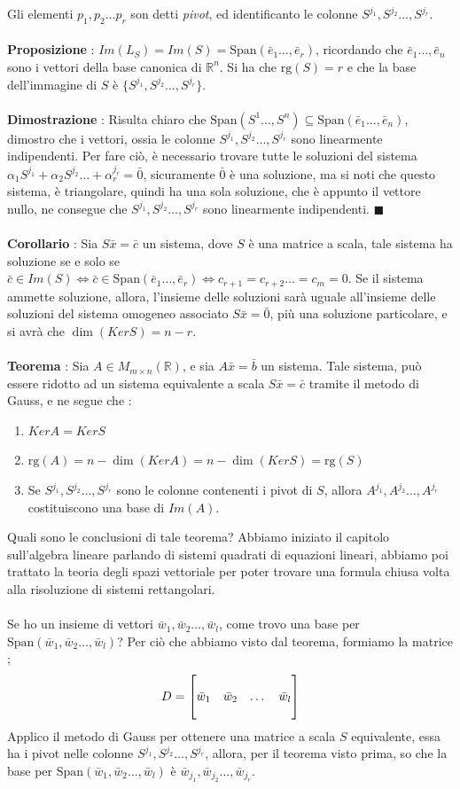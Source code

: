 \documentclass[12pt, letterpaper]{article}
\newcommand{\R}{{\mathbb R}}
\newcommand{\rg}{{\text{rg}}}
\newcommand{\acc}{\\\hphantom{}\\}
\newcommand{\Span}{{\text{Span}}}
\begin{document}
Gli elementi \(p_1,p_2\dots p_r\) son detti \textit{pivot}, ed identificanto le colonne \(S^{j_1},S^{j_2}\dots,S^{j_r}\).\acc 
\textbf{Proposizione} : \(Im(L_S)=Im(S)=\Span(\bar e_1\dots,\bar e_r)\), ricordando che \(\bar e_1\dots,\bar e_n\) sono i 
vettori della base canonica di \(\R^n\). Si ha che \(\rg(S)=r\) e che la base dell'immagine di \(S\) è \(\{S^{j_1},S^{j_2}\dots,S^{j_r}\}\).\acc 
\textbf{Dimostrazione} : Risulta chiaro che \(\Span(S^1\dots,S^n)\subseteq \Span(\bar e_1\dots,\bar e_n)\), dimostro che 
i vettori, ossia le colonne \(S^{j_1},S^{j_2}\dots,S^{j_r}\) sono linearmente indipendenti. Per fare ciò, è necessario trovare tutte 
le soluzioni del sistema  \(\alpha_1S^{j_1}+\alpha_2S^{j_2}\dots+\alpha_r^{j_r}=\bar 0\), sicuramente \(\bar 0\) è una soluzione, 
ma si noti che questo sistema, è triangolare, quindi ha una sola soluzione, che è appunto il vettore nullo, ne consegue che 
\(S^{j_1},S^{j_2}\dots,S^{j_r}\) sono linearmente indipendenti. \(\blacksquare\)\acc 
\textbf{Corollario} : Sia \(S\bar x=\bar c\) un sistema, dove \(S\) è una matrice a scala, tale sistema ha soluzione 
se e solo se \(\bar c \in Im(S)\iff \bar c \in \Span(\bar e_1\dots,\bar e_r)\iff c_{r+1}=c_{r+2}\dots = c_m=0\).
Se il sistema ammette soluzione, allora, l'insieme delle soluzioni sarà uguale all'insieme delle soluzioni 
del sistema omogeneo associato \(S\bar x=\bar0\), più una soluzione particolare, e si avrà che \(\dim(KerS)=n-r\).\acc 
\textbf{Teorema} : Sia \(A\in M_{m\times n}(\R)\), e sia \(A\bar x = \bar b\) un sistema. Tale sistema, può essere ridotto 
ad un sistema equivalente a scala \(S\bar x = \bar c\) tramite il metodo di Gauss, e ne segue che : \begin{enumerate}
    \item \(KerA=KerS\) 
    \item \(\rg(A)=n-\dim(KerA)=n-\dim(KerS)=\rg(S)\) 
    \item Se \(S^{j_1},S^{j_2}\dots,S^{j_r}\) sono le colonne contenenti i pivot di \(S\), allora 
    \(A^{j_1},A^{j_2}\dots,A^{j_r}\) costituiscono una base di \(Im(A)\).
\end{enumerate}
Quali sono le conclusioni di tale teorema? Abbiamo iniziato il capitolo sull'algebra lineare parlando di sistemi 
quadrati di equazioni lineari, abbiamo poi trattato la teoria degli spazi vettoriale per poter trovare una formula chiusa volta 
alla risoluzione di sistemi rettangolari.\acc 
Se ho un insieme di vettori \(\bar w_1,\bar w_2\dots,\bar w_l\), come trovo una base per \(\Span(\bar w_1,\bar w_2\dots,\bar w_l)\)?
Per ciò che abbiamo visto dal teorema, formiamo la matrice ; $$D=\begin{bmatrix}
    \hphantom{}&\hphantom{}&\hphantom{}&\hphantom{}\\
    \bar w_1&\bar w_2&\dots&\bar w_l\\
    \hphantom{}&\hphantom{}&\hphantom{}&\hphantom{}
\end{bmatrix}$$ Applico il metodo di Gauss per ottenere una matrice a scala \(S\) equivalente, essa ha i pivot 
nelle colonne \(S^{j_1},S^{j_2}\dots,S^{j_r}\), allora, per il teorema visto prima, so che la base 
per \(\Span(\bar w_1,\bar w_2\dots,\bar w_l)\) è \(\bar w_{j_1},\bar w_{j_2}\dots,\bar w_{j_r}\).\acc 
\end{document}
